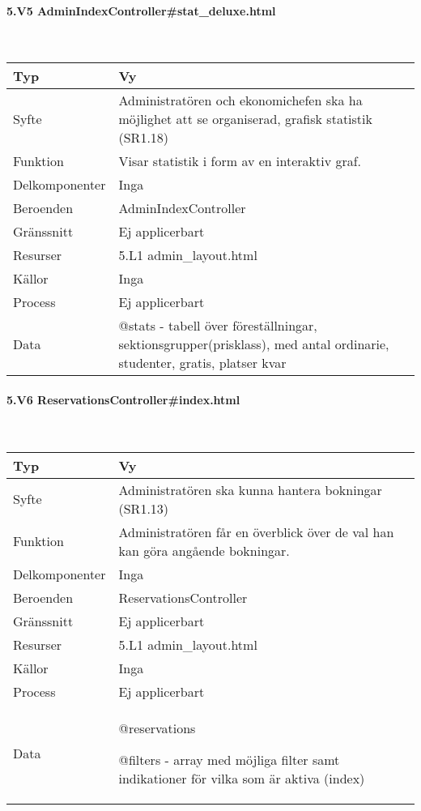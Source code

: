 \documentclass[a4paper, twoside, 11pt, titlepage]{article}
\begin{document}
			\paragraph{5.V5 AdminIndexController\#stat\_deluxe.html}\

			\begin {table} [ht] \begin{tabular} {  p{3.5cm} p{9.6cm} }
				\hline
				{Typ} & {Vy} \\
				\hline
				{Syfte} & {Administratören och ekonomichefen ska ha möjlighet att se organiserad, grafisk statistik (SR1.18)} \\
				\hline
				{Funktion} & {Visar statistik i form av en interaktiv graf.} \\
				\hline
				{Delkomponenter} & {Inga} \\
				\hline
				{Beroenden} & {AdminIndexController} \\
				\hline
				{Gränssnitt} & {Ej applicerbart} \\
				\hline
				{Resurser} & {5.L1 admin\_layout.html} \\
				\hline
				{Källor} & {Inga} \\
				\hline
				{Process} & {Ej applicerbart} \\
				\hline
				{Data} & {@stats - tabell över föreställningar, sektionsgrupper(prisklass), med antal ordinarie, studenter, gratis, platser kvar} \\
				\hline
			\end{tabular} \end{table} \FloatBarrier


			\paragraph{5.V6 ReservationsController\#index.html}\

			\begin {table} [ht] \begin{tabular} {  p{3.5cm} p{9.6cm} }
				\hline
				{Typ} & {Vy} \\
				\hline
				{Syfte} & {Administratören ska kunna hantera bokningar (SR1.13)} \\
				\hline
				{Funktion} & {Administratören får en överblick över de val han kan göra angående bokningar.} \\
				\hline
				{Delkomponenter} & {Inga} \\
				\hline
				{Beroenden} & {ReservationsController} \\
				\hline
				{Gränssnitt} & {Ej applicerbart} \\
				\hline
				{Resurser} & {5.L1 admin\_layout.html} \\
				\hline
				{Källor} & {Inga} \\
				\hline
				{Process} & {Ej applicerbart} \\
				\hline
				{Data} & {@reservations

@filters - array med möjliga filter samt indikationer för vilka som är aktiva (index)} \\
				\hline
			\end{tabular} \end{table} \FloatBarrier
\end{document}
